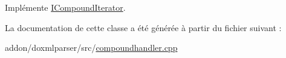 Implémente \hyperlink{class_i_compound_iterator_a424b2507309eb8780c9f37ad2969e518}{I\+Compound\+Iterator}.



La documentation de cette classe a été générée à partir du fichier suivant \+:\begin{DoxyCompactItemize}
\item 
addon/doxmlparser/src/\hyperlink{compoundhandler_8cpp}{compoundhandler.\+cpp}\end{DoxyCompactItemize}
